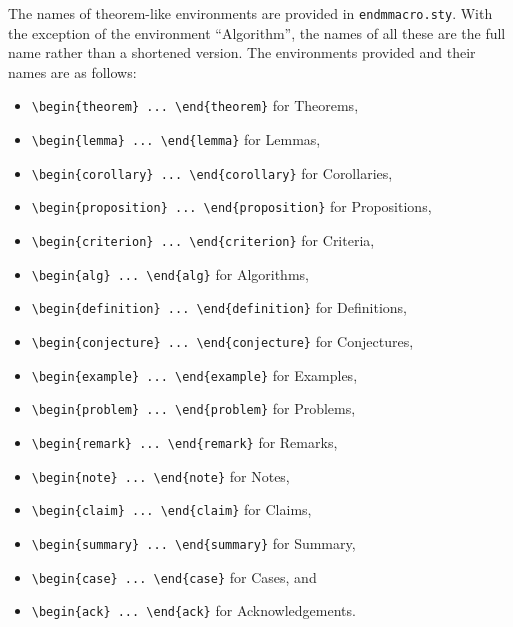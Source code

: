 \documentclass{endm}
\begin{document}
The names of theorem-like environments are provided in
\texttt{endmmacro.sty}. With the exception of the environment
``Algorithm'', the names of all these are the full name rather than a
shortened version. The environments provided and their names are as
follows:
\begin{itemize}
\item \verb+\begin{theorem} ... \end{theorem}+ for Theorems,
\item \verb+\begin{lemma} ... \end{lemma}+ for Lemmas,
\item \verb+\begin{corollary} ... \end{corollary}+ for Corollaries,
\item \verb+\begin{proposition} ... \end{proposition}+ for Propositions,
\item \verb+\begin{criterion} ... \end{criterion}+ for Criteria,
\item \verb+\begin{alg} ... \end{alg}+ for Algorithms,
\item \verb+\begin{definition} ... \end{definition}+ for Definitions,
\item \verb+\begin{conjecture} ... \end{conjecture}+ for Conjectures,
\item \verb+\begin{example} ... \end{example}+ for Examples,
\item \verb+\begin{problem} ... \end{problem}+ for Problems,
\item \verb+\begin{remark} ... \end{remark}+ for Remarks,
\item \verb+\begin{note} ... \end{note}+ for Notes,
\item \verb+\begin{claim} ... \end{claim}+ for Claims,
\item \verb+\begin{summary} ... \end{summary}+ for Summary,
\item \verb+\begin{case} ... \end{case}+ for Cases, and
\item \verb+\begin{ack} ... \end{ack}+ for Acknowledgements.
\end{itemize}
\end{document}
